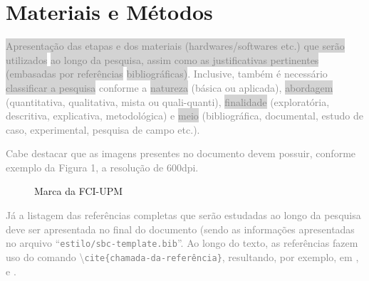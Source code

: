 \section{Materiais e Métodos}
\textcolor{gray}{\colorbox{lightgray}{Apresentação das etapas e dos materiais (hardwares/softwares etc.) que serão utilizados} 
\colorbox{lightgray}{ao longo da pesquisa, assim como as justificativas pertinentes (embasadas por referências} 
\colorbox{lightgray}{bibliográficas)}. Inclusive, também é necessário \colorbox{lightgray}{classificar a pesquisa} conforme a \colorbox{lightgray}{natureza} (básica ou aplicada), \colorbox{lightgray}{abordagem} (quantitativa, qualitativa, mista ou quali-quanti), \colorbox{lightgray}{finalidade} (exploratória, descritiva, explicativa, metodológica) e \colorbox{lightgray}{meio} (bibliográfica, documental, estudo de caso, experimental, pesquisa de campo etc.).}

\textcolor{gray}{Cabe destacar que as imagens presentes no documento devem possuir, conforme exemplo da Figura 1, a resolução de 600dpi.} 

\begin{figure}[h]
\centering

\caption{Marca da FCI-UPM}
\end{figure}

\textcolor{gray}{Já a listagem das referências completas que serão estudadas ao longo da pesquisa deve ser apresentada no final do documento (sendo as informações apresentadas no arquivo ``\texttt{estilo/sbc-template.bib}''. Ao longo do texto, as referências fazem uso do comando  \textbackslash\texttt{cite\{chamada-da-referência\}}, resultando, por exemplo, em \cite{boulic:91}, \cite{smith:99} e \cite{knuth:84}.}
